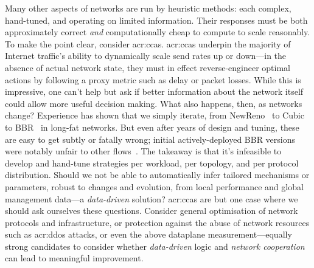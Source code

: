 Many other aspects of networks are run by heuristic methods: each complex, hand-tuned, and operating on limited information.
Their responses must be both approximately correct \emph{and} computationally cheap to compute to scale reasonably.
To make the point clear, consider \glspl{acr:cca}.
\glspl{acr:cca} underpin the majority of Internet traffic's ability to dynamically scale send rates up or down---in the absence of actual network state, they must in effect reverse-engineer optimal actions by following a proxy metric such as delay or packet losses.
While this is impressive, one can't help but ask if better information about the network itself could allow more useful decision making.
What also happens, then, as networks change? %
Experience has shown that we simply iterate, from NewReno~\parencite{rfc6582} to Cubic~\parencite{rfc8312} to BBR~\parencite{DBLP:journals/queue/CardwellCGYJ16} in long-fat networks.
But even after years of design and tuning, these are easy to get subtly or fatally wrong; initial actively-deployed BBR versions were notably unfair to other flows~\parencite{DBLP:conf/imc/WareMSS19}.
The takeaway is that it's infeasible to develop and hand-tune strategies per workload, per topology, and per protocol distribution.
Should we not be able to automatically infer tailored mechanisms or parameters, robust to changes and evolution, from local performance and global management data---a \emph{data-driven} solution?
\glspl{acr:cca} are but one case where we should ask ourselves these questions.
Consider general optimisation of network protocols and infrastructure, or protection against the abuse of network resources such as \gls{acr:ddos} attacks, or even the above dataplane measurement---equally strong candidates to consider whether \emph{data-driven} logic and \emph{network cooperation} can lead to meaningful improvement.


